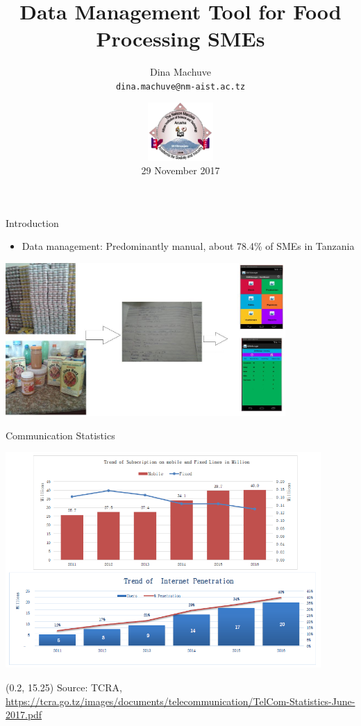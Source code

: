 \documentclass{beamer}
\begin{document}
\title{Data Management Tool for Food Processing SMEs}   
\author{Dina Machuve\\ \texttt{dina.machuve@nm-aist.ac.tz}} 

\date{
\includegraphics[height=6em]{"figs/nm-logo"}
	\\
	\vspace{1em}
29 November 2017 } 
\frame{\titlepage}

\begin{frame}{Introduction}
	\begin{itemize}
	\item Data management: Predominantly manual, about 78.4\% of SMEs in Tanzania
	\end{itemize} 
		\begin{center}
		\includegraphics[width=0.8\textwidth]{figs/SMEmanagerApp.jpg}
		\end{center}
\end{frame}

\begin{frame}{Communication Statistics}
		\begin{center}
		\includegraphics[width=0.9\textwidth]{figs/stats.png}
		\end{center}
	 \begin{textblock}{25}(0.2, 15.25)
		{\tiny Source: TCRA, \url{https://tcra.go.tz/images/documents/telecommunication/TelCom-Statistics-June-2017.pdf}}
     \end{textblock}
\end{frame}
\end{document}
